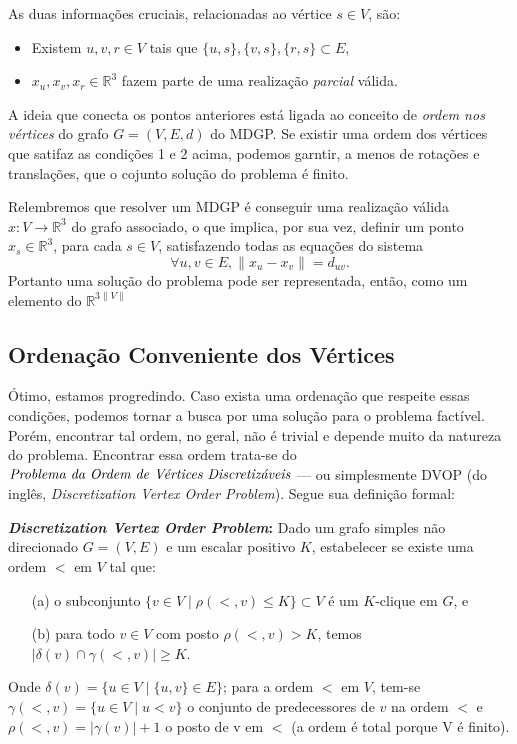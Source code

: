 \documentclass[a4paper,12pt]{article}
\begin{document}
	As duas informações cruciais, relacionadas ao vértice $s\in V$, são:
	\begin{itemize}
		\item Existem $u, v, r \in V$ tais que $\{u, s\}, \{v, s\}, \{r, s\}\subset E$,
		\item $x_{u}, x_{v}, x_{r} \in\mathbb{R}^{3}$ fazem parte de uma realização \textit{parcial} válida. 
	\end{itemize}
	
	A ideia que conecta os pontos anteriores está ligada ao conceito de \textit{ordem nos vértices} do grafo $G = (V, E, d)$ do MDGP. Se existir uma ordem dos vértices que satifaz as condições 1 e 2 acima, podemos garntir, a menos de rotações e translações, que o cojunto solução do problema é finito.
	
	Relembremos que resolver um MDGP é conseguir uma realização válida $x: V \rightarrow\mathbb{R}^{3}$ do grafo associado, o que implica, por sua vez, definir um ponto $x_{s}\in\mathbb{R}^3$, para cada $s\in V$, satisfazendo todas as equações do sistema
	$$
	\forall {u, v}\in E, \|x_{u} - x_{v}\| = d_{uv}.
	$$
	Portanto uma solução do problema pode ser representada, então, como um elemento do $\mathbb{R}^{3\|V\|}$
	
	\subsection{Ordenação Conveniente dos Vértices}
	Ótimo, estamos progredindo. Caso exista uma ordenação que respeite essas condições, podemos tornar a busca por uma solução para o problema factível. Porém, encontrar tal ordem, no geral, não é trivial e depende muito da natureza do problema. Encontrar essa ordem trata-se do $\emph{Problema da Ordem de Vértices Discretizáveis}$ --- ou simplesmente DVOP (do inglês, \textit{Discretization Vertex Order Problem}). Segue sua definição formal:
	
	\begin{center}
		\begin{minipage}{0.9 \linewidth}
			\textbf{\textit{Discretization Vertex Order Problem}:} Dado um grafo simples não direcionado $G = (V, E)$ e um escalar positivo $K$, estabelecer se existe uma ordem $<$ em $V$ tal que: 
			\begin{enumerate}
				\item[(a)] o subconjunto $\{v \in V \mid \rho(<,v) \leq K\} \subset V$ é um $K$-clique em $G$, e
				\item[(b)] para todo $v \in V$ com posto $\rho(<,v) > K$, temos $|\delta(v) \cap \gamma(<,v)| \geq K$.
			\end{enumerate}
			Onde $\delta(v) = \{u \in V \mid  \{u,v\} \in E\}$; para a ordem $<$ em $V$, tem-se $\gamma(<,v) = \{u \in V \mid u < v\}$ o conjunto de predecessores de $v$ na ordem $<$ e $\rho(<,v) = |\gamma(v)| + 1$ o posto de v em $<$ (a ordem é total porque V é finito).
		\end{minipage}
	\end{center}
\end{document}
